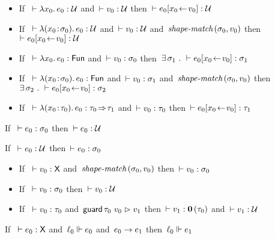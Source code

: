\documentclass[nonacm,10pt]{acmart}
\begin{document}
\begin{lemma}\leavevmode
  \begin{itemize}
    \item
      If\ $~\vdash \lambda x_0.\, e_0 : \mathcal{U}$
      and\ $\vdash v_0 : \mathcal{U}$
      then\ $\vdash e_0[x_0\!\leftarrow\!v_0] : \mathcal{U}$
    \item
      If\ $~\vdash \lambda (x_0\!:\!\sigma_0).\, e_0 : \mathcal{U}$
      and\ $\vdash v_0 : \mathcal{U}$
      and\ $\textit{shape-match}\,(\sigma_0, v_0)$
      then\ $\vdash e_0[x_0\!\leftarrow\!v_0] : \mathcal{U}$
    \item
      If\ $~\vdash \lambda x_0.\, e_0 : \mathsf{Fun}$
      and\ $\vdash v_0 : \sigma_0$
      then\ $\exists\,\sigma_1~.~ \vdash e_0[x_0\!\leftarrow\!v_0] : \sigma_1$
    \item
      If\ $~\vdash \lambda (x_0\!:\!\sigma_0).\, e_0 : \mathsf{Fun}$
      and\ $\vdash v_0 : \sigma_1$
      and\ $\textit{shape-match}\,(\sigma_0, v_0)$
      then\ $\exists\,\sigma_2~.~ \vdash e_0[x_0\!\leftarrow\!v_0] : \sigma_2$
    \item
      If\ $~\vdash \lambda (x_0\!:\!\tau_0).\, e_0 : \tau_0\!\Rightarrow\!\tau_1$
      and\ $\vdash v_0 : \tau_0$
      then\ $\vdash e_0[x_0\!\leftarrow\!v_0] : \tau_1$
  \end{itemize}
\end{lemma}

\begin{lemma}[S to U]
  If\ $~\vdash e_0 : \sigma_0$
  then\ $\vdash e_0 : \mathcal{U}$
\end{lemma}

\begin{lemma}[U to S]
  If\ $~\vdash e_0 : \mathcal{U}$
  then\ $\vdash e_0 : \sigma_0$
\end{lemma}

\begin{lemma}[boundary]\leavevmode
  \begin{itemize}
    \item
      If\ $~\vdash v_0 : \mathsf{X}$
      and\ $\textit{shape-match}\,(\sigma_0, v_0)$
      then\ $\vdash v_0 : \sigma_0$
    \item
      If\ $~\vdash v_0 : \sigma_0$
      then\ $\vdash v_0 : \mathcal{U}$
    \item
      If\ $~\vdash v_0 : \tau_0$
      and\ $\mathsf{guard}\,\tau_0~v_0 \vartriangleright v_1$
      then\ $\vdash v_1 : \mathbf{0}\,(\tau_0)$
      and\ $\vdash v_1 : \mathcal{U}$
  \end{itemize}
\end{lemma}

\begin{lemma}
  If\ $~\vdash e_0 : \mathsf{X}$
  and\ $\ell_0 \Vdash e_0$
  and\ $e_0 \rightarrow e_1$
  then\ $\ell_0 \Vdash e_1$
\end{lemma}
\end{document}
